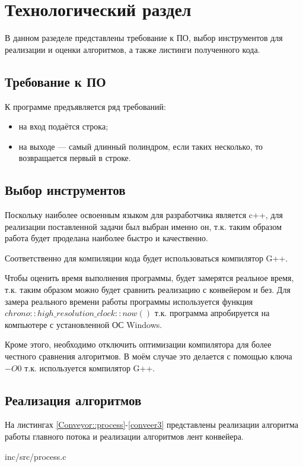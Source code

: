 \chapter{Технологический раздел}
В данном разеделе представлены требование к ПО, выбор инструментов для реализации и оценки алгоритмов, а также листинги полученного кода.

\section{Требование к ПО}

К программе предъявляется ряд требований:

\begin{itemize}
	\item на вход подаётся строка;
	\item на выходе — самый длинный полиндром, если таких несколько, то возвращается первый в строке.
\end{itemize}

\section{Выбор инструментов}
Поскольку наиболее освоенным языком для разработчика является c++, для реализации поставленной задачи был выбран именно он, т.к. таким образом работа будет проделана наиболее быстро и качественно.

Соответственно для компиляции кода будет использоваться компилятор G++.

Чтобы оценить время выполнения программы, будет замерятся реальное время, т.к. таким образом можно будет сравнить реализацию с конвейером и без. Для замера реального времени работы программы используется функция $chrono::high\_resolution\_clock::now()$ т.к. программа апробируется на компьютере с установленной ОС Windows. \cite{chrono}

Кроме этого, необходимо отключить оптимизации компилятора для более честного сравнения алгоритмов. В моём случае это делается с помощью ключа $-O0$ т.к. используется компилятор G++. \cite{gcc_optimization}

\section{Реализация алгоритмов}
На листингах \ref{Conveyor::process}-\ref{conveer3} представлены реализации алгоритма работы главного потока и реализации алгоритмов лент конвейера.

\begin{lstinputlisting}[
	caption={Реализация алгоритма работы главного потока},
	label={Conveyor::process},
	style={c},
	]{inc/src/process.c}
\end{lstinputlisting}

